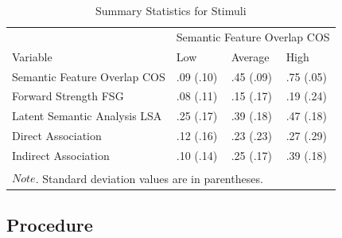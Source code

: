 \documentclass[english,,man]{apa6}
\begin{document}
\begin{table}[t]

\caption{\label{tab:stim-table}Summary Statistics for Stimuli}
\centering
\begin{tabular}{llll}
\toprule
\multicolumn{1}{c}{ } & \multicolumn{3}{c}{Semantic Feature Overlap COS} \\
\cmidrule(l{3pt}r{3pt}){2-4}
Variable & Low & Average & High\\
\midrule
Semantic Feature Overlap COS & .09 (.10) & .45 (.09) & .75 (.05)\\
Forward Strength FSG & .08 (.11) & .15 (.17) & .19 (.24)\\
Latent Semantic Analysis LSA & .25 (.17) & .39 (.18) & .47 (.18)\\
Direct Association & .12 (.16) & .23 (.23) & .27 (.29)\\
Indirect Association & .10 (.14) & .25 (.17) & .39 (.18)\\
\bottomrule
\multicolumn{4}{l}{\textsuperscript{} $Note$. Standard deviation values are in parentheses.}\\
\end{tabular}
\end{table}

\hypertarget{procedure}{%
\subsection{Procedure}\label{procedure}}
\end{document}
